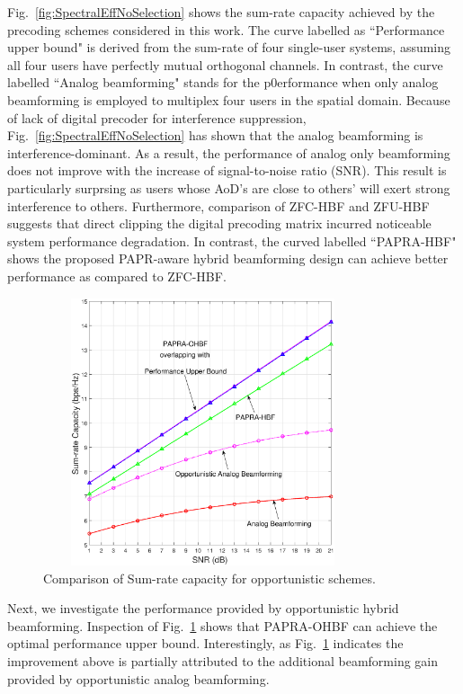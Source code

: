 \documentclass[conference]{IEEEtran}
\begin{document}
Fig.~\ref{fig:SpectralEffNoSelection} shows the sum-rate capacity achieved by the precoding schemes considered in this work. The curve labelled as ``Performance upper bound" is derived from the sum-rate of four single-user systems, assuming all four users have perfectly mutual orthogonal channels. In contrast, the curve labelled ``Analog beamforming" stands for the p0erformance when only analog beamforming is employed to multiplex four users in the spatial domain. Because of lack of digital precoder for interference suppression, Fig.~\ref{fig:SpectralEffNoSelection} has shown that the analog beamforming is interference-dominant. As a result, the performance of analog only beamforming does not improve with the increase of signal-to-noise ratio (SNR). This result is particularly surprsing as users whose AoD's are close to others' will exert strong interference to others. Furthermore, comparison of ZFC-HBF and ZFU-HBF suggests that direct clipping the digital precoding matrix incurred noticeable system performance degradation. In contrast, the curved labelled ``PAPRA-HBF" shows the proposed PAPR-aware hybrid beamforming design can achieve better performance as compared to ZFC-HBF.

\begin{figure}[ht]
 	\begin{center}
 	\includegraphics[width=3.7in,height=3.1in]{Figure/SpectralEffWithSelection2.eps}
 	\caption{Comparison of Sum-rate capacity for opportunistic schemes.}\label{fig:SpectralEffWithSelection}
    \end{center}
\end{figure}

Next, we investigate the performance provided by opportunistic hybrid beamforming. Inspection of Fig.~\ref{fig:SpectralEffWithSelection} shows that PAPRA-OHBF can achieve the optimal performance upper bound. Interestingly, as Fig.~\ref{fig:SpectralEffWithSelection} indicates the improvement above is partially attributed to the additional beamforming gain provided by opportunistic analog beamforming.
\end{document}
